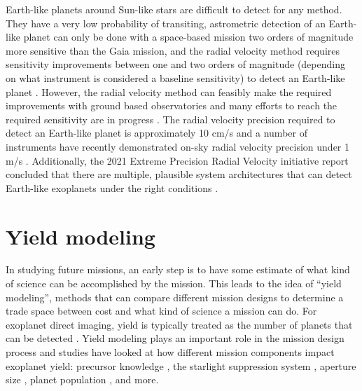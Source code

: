 Earth-like planets around Sun-like stars are difficult to detect for any
method. They have a very low probability of transiting, astrometric detection
of an Earth-like planet can only be done with a space-based mission two orders
of magnitude more sensitive than the Gaia mission, and the radial velocity
method requires sensitivity improvements between one and two orders of
magnitude (depending on what instrument is considered a baseline sensitivity)
to detect an Earth-like planet \citep{gaudiHabitableExoplanetObservatory2020}.
However, the radial velocity method can feasibly make the required improvements
with ground based observatories and many efforts to reach the required
sensitivity are in progress \citep{Fischer2016a}. The radial velocity precision
required to detect an Earth-like planet is approximately 10 cm/s and a number
of instruments have recently demonstrated on-sky radial velocity precision
under 1 m/s \citep{Seifahrt2021, guptaTargetPrioritization2021,Pepe2021}.
Additionally, the 2021 Extreme Precision Radial Velocity initiative report
concluded that there are multiple, plausible system architectures that can
detect Earth-like exoplanets under the right conditions \citep{Crass2021}.

\section{Yield modeling}
\label{sec:intro_yield_modeling}

In studying future missions, an early step is to have some estimate of what
kind of science can be accomplished by the mission. This leads to the idea of
``yield modeling'', methods that can compare different mission designs to
determine a trade space between cost and what kind of science a mission can do.
For exoplanet direct imaging, yield is typically treated as the number of
planets that can be detected
\citep{brownSingleVisitPhotometric2005,savranskyAnalyzingDesignsPlanetFinding2010,
starkMaximizingExoEarthCandidate2014}. Yield modeling plays an important role
in the mission design process and studies have looked at how different
mission components impact exoplanet yield: precursor knowledge
\citep{morganFasterExoEarth2021}, the starlight suppression system
\citep{savranskyAnalyzingDesignsPlanetFinding2010,morgan19, Stark2016},
aperture size \citep{starkLowerLimitsAperture2015}, planet population
\citep{savranskyComparisonAnalyticalDepth2016}, and more. 

